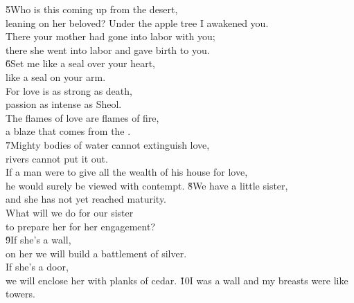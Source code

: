 \begin{poetry}
\poeml \v{5}Who is this coming up from the desert, \\
\poemll    leaning on her beloved?
\poeml Under the apple tree I awakened you. \\
\poemll    There your mother had gone into labor with you; \\
\poemlll       there she went into labor and gave birth to you. \\
\poeml \v{6}Set me like a seal over your heart, \\
\poemll    like a seal on your arm. \\
\poeml For love is as strong as death, \\
\poemll    passion as intense as Sheol. \\
\poeml The flames of love are flames of fire, \\
\poemll    a blaze that comes from the . \\
\poeml \v{7}Mighty bodies of water cannot extinguish love, \\
\poemll    rivers cannot put it out. \\
\poeml If a man were to give all the wealth of his house for love, \\
\poemll    he would surely be viewed with contempt.
\poeml \v{8}We have a little sister, \\
\poemll    and she has not yet reached maturity. \\
\poeml What will we do for our sister \\
\poemll    to prepare her for her engagement? \\
\poeml \v{9}If she's a wall, \\
\poemll    on her we will build a battlement of silver. \\
\poeml If she's a door, \\
\poemll    we will enclose her with planks of cedar.
\poeml \v{10}I was a wall and my breasts were like towers. \\

\end{poetry}

